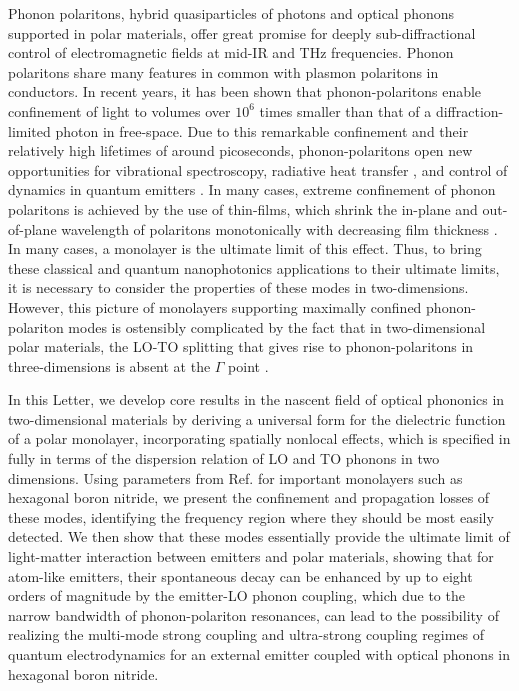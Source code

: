 \documentclass[aps,prb,twocolumn,
groupedaddress,superscriptaddress,
amsfonts,amssymb,amsmath,floatfix,
citeautoscript]{revtex4-1}
\begin{document}
	Phonon polaritons, hybrid quasiparticles of photons and optical phonons supported in polar materials, offer great promise for deeply sub-diffractional control of electromagnetic fields at mid-IR and THz frequencies. Phonon polaritons share many features in common with plasmon polaritons in conductors. In recent years, it has been shown that phonon-polaritons enable confinement of light to volumes over $10^6$ times smaller than that of a diffraction-limited photon in free-space\cite{caldwell2013low,xu2014mid,caldwell2014sub,dai2014tunable,tomadin2015accessing,yoxall2015direct,li2015hyperbolic,dai2015subdiffractional,dai2015graphene,caldwell2015low,li2016reversible,Basov:2016,basov2017towards,low2017polaritons,giles2017ultra,li2018infrared,ma2018plane}. Due to this remarkable confinement and their relatively high lifetimes of around picoseconds, phonon-polaritons open new opportunities for vibrational spectroscopy, radiative heat transfer \cite{hillenbrand2002phonon}, and control of dynamics in quantum emitters \cite{kumar2015tunable,rivera2017making,kurman2018control}. In many cases, extreme confinement of phonon polaritons is achieved by the use of thin-films, which shrink the in-plane and out-of-plane wavelength of polaritons monotonically with decreasing film thickness \cite{dai2014tunable,dubrovkin2018ultra}. In many cases, a monolayer is the ultimate limit of this effect. Thus, to bring these classical and quantum nanophotonics applications to their ultimate limits, it is necessary to consider the properties of these modes in two-dimensions. However, this picture of monolayers supporting maximally confined phonon-polariton modes is ostensibly complicated by the fact that in two-dimensional polar materials, the LO-TO splitting that gives rise to phonon-polaritons in three-dimensions is absent at the $\Gamma$ point \cite{sanchez2002vibrational,mele2002electric,serrano2007vibrational,sohier2017breakdown}.
	
	In this Letter, we develop core results in the nascent field of optical phononics in two-dimensional materials by deriving a universal form for the dielectric function of a polar monolayer, incorporating spatially nonlocal effects, which is specified in fully in terms of the dispersion relation of LO and TO phonons in two dimensions. Using parameters from Ref. \cite{sohier2017breakdown} for important monolayers such as hexagonal boron nitride, we present the confinement and propagation losses of these modes, identifying the frequency region where they should be most easily detected. We then show that these modes essentially provide the ultimate limit of light-matter interaction between emitters and polar materials, showing that for atom-like emitters, their spontaneous decay can be enhanced by up to eight orders of magnitude by the emitter-LO phonon coupling, which due to the narrow bandwidth of phonon-polariton resonances, can lead to the possibility of realizing the multi-mode strong coupling and ultra-strong coupling regimes of quantum electrodynamics for an external emitter coupled with optical phonons in hexagonal boron nitride. 
	
\end{document}

